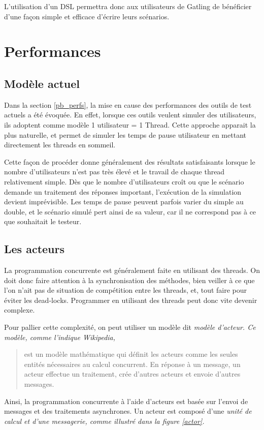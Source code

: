 L'utilisation d'un DSL permettra donc aux utilisateurs de Gatling de bénéficier d'une façon simple et efficace d'écrire leurs scénarios.

\section{Performances}
\subsection{Modèle actuel}
Dans la section \ref{pb_perfs}, la mise en cause des performances des outils de test actuels a été évoquée. En effet, lorsque ces outils veulent simuler des utilisateurs, ils adoptent comme modèle 1 utilisateur = 1 Thread. Cette approche apparait la plus naturelle, et permet de simuler les temps de pause utilisateur en mettant directement les threads en sommeil.

Cette façon de procéder donne généralement des résultats satisfaisants lorsque le nombre d'utilisateurs n'est pas très élevé et le travail de chaque thread relativement simple. Dès que le nombre d'utilisateurs croît ou que le scénario demande un traitement des réponses important, l'exécution de la simulation devient imprévisible. Les temps de pause peuvent parfois varier du simple au double, et le scénario simulé pert ainsi de sa valeur, car il ne correspond pas à ce que souhaitait le testeur. 

\subsection{Les acteurs}
La programmation concurrente est généralement faite en utilisant des threads. On doit donc faire attention à la synchronisation des méthodes, bien veiller à ce que l'on n'ait pas de situation de compétition entre les threads, et, tout faire pour éviter les dead-locks. Programmer en utilisant des threads peut donc vite devenir complexe.

Pour pallier cette complexité, on peut utiliser un modèle dit \em{modèle d'acteur}. Ce modèle, comme l'indique Wikipedia, \begin{quote}est un modèle mathématique qui définit les acteurs comme les seules entités nécessaires au calcul concurrent. En réponse à un message, un acteur effectue un traitement, crée d'autres acteurs et envoie d'autres messages.\end{quote}

Ainsi, la programmation concurrente à l'aide d'acteurs est basée sur l'envoi de messages et des traitements asynchrones. Un acteur est composé d'une \em{unité de calcul} et d'une \em{messagerie}, comme illustré dans la figure \ref{actor}.

